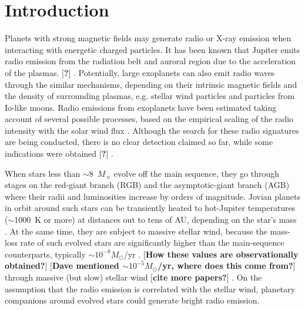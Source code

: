 \documentclass{emulateapj}
\def\memoYF#1{\color{red}$[${\bf #1}$]$ \color{black}}
\begin{document}

\section{Introduction}
\label{sec:intro}



Planets with strong magnetic fields may generate radio or X-ray emission when interacting with energetic charged particles. 
It has been known that Jupiter emits radio emission from the radiation belt and auroral region due to the acceleration of the plasmas. \memoYF{?}. Potentially, large exoplanets can also emit radio waves through the similar mechanisms, depending on their intrinsic magnetic fields and the density of surrounding plasmas, e.g. stellar wind particles and particles from Io-like moons. 
Radio emissions from exoplanets have been estimated taking account of several possible processes, based on the empirical scaling of the radio intensity with the solar wind flux \citep{zarka2001,griebmeier2007,noyola2014}. 
Although the search for these radio signatures are being conducted, there is no clear detection claimed so far, while some indications were obtained \memoYF{?} \citep{lecavelier_et_al2013}. 


When stars less than $\sim$8~$M_\sun$ evolve off the main sequence,
they go through stages on the red-giant branch (RGB) and the
asymptotic-giant branch (AGB) where their radii and luminosities increase by orders of magnitude. 
Jovian planets in orbit around such stars can be transiently heated to hot-Jupiter temperatures ($\sim$1000~K or more) at distances out to tens of AU, depending on the star's mass \citet{spiegel+madhusudhan2012}. 
At the same time, they are subject to massive stellar wind, because the mass-loss rate of such evolved stars are significantly higher than the main-sequence counterparts, typically $\sim  10^{-8} M_{\odot }$/yr \citep{judge1991}. \memoYF{How these values are observationally obtained?} \memoYF{Dave mentioned $\sim  10^{-5} M_{\odot }$/yr, where does this come from?} through massive (but slow) stellar wind \citep{suzuki2008} \memoYF{cite more papers?}. 
On the assumption that the radio emission is correlated with the stellar wind, planetary companions around evolved stars could generate bright radio emission. 
\end{document}
